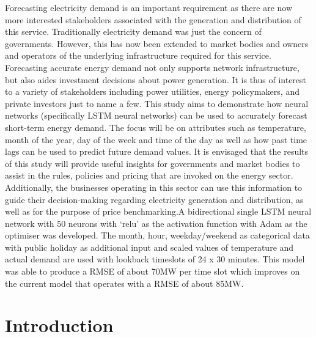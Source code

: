 \documentclass[mstat,12pt]{unswthesis}
\begin{document}
Forecasting electricity demand is an important requirement as there are
now more interested stakeholders associated with the generation and
distribution of this service. Traditionally electricity demand was just
the concern of governments. However, this has now been extended to
market bodies and owners and operators of the underlying infrastructure
required for this service. Forecasting accurate energy demand not only
supports network infrastructure, but also aides investment decisions
about power generation. It is thus of interest to a variety of
stakeholders including power utilities, energy policymakers, and private
investors just to name a few. This study aims to demonstrate how neural
networks (specifically LSTM neural networks) can be used to accurately
forecast short-term energy demand. The focus will be on attributes such
as temperature, month of the year, day of the week and time of the day
as well as how past time lags can be used to predict future demand
values. It is envisaged that the results of this study will provide
useful insights for governments and market bodies to assist in the
rules, policies and pricing that are invoked on the energy sector.
Additionally, the businesses operating in this sector can use this
information to guide their decision-making regarding electricity
generation and distribution, as well as for the purpose of price
benchmarking.A bidirectional single LSTM neural network with 50 neurons
with `relu' as the activation function with Adam as the optimiser was
developed. The month, hour, weekday/weekend as categorical data with
public holiday as additional input and scaled values of temperature and
actual demand are used with lookback timeslots of 24 x 30 minutes. This
model was able to produce a RMSE of about 70MW per time slot which
improves on the current model that operates with a RMSE of about 85MW.



\afterpreface





%
%






\hypertarget{introduction}{%
\chapter{Introduction}\label{introduction}}
\end{document}
